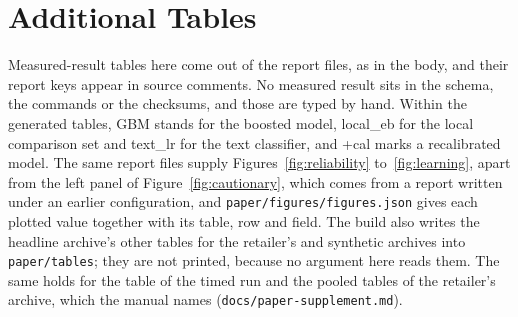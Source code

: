 



\section{Additional Tables}
\label{app:tables}
Measured-result tables here come out of the report files, as in the body, and their report keys appear in source comments. No measured result sits in the schema, the commands or the checksums, and those are typed by hand. Within the generated tables, GBM stands for the boosted model, local\_eb for the local comparison set and text\_lr for the text classifier, and +cal marks a recalibrated model. The same report files supply Figures~\ref{fig:reliability} to~\ref{fig:learning}, apart from the left panel of Figure~\ref{fig:cautionary}, which comes from a report written under an earlier configuration, and \texttt{paper/figures/figures.json} gives each plotted value together with its table, row and field.
The build also writes the headline archive's other tables for the retailer's and synthetic archives into \texttt{paper/tables}; they are not printed, because no argument here reads them. The same holds for the table of the timed run and the pooled tables of the retailer's archive, which the manual names (\texttt{docs/paper-supplement.md}).

\begin{table}[tp]
\centering\small
\caption{Row of the ledger: the exchange format's fields (Section~\ref{sec:setting}), set out in groups; what is shown is a format and not a measurement.}
\label{tab:schema}
\end{table}


